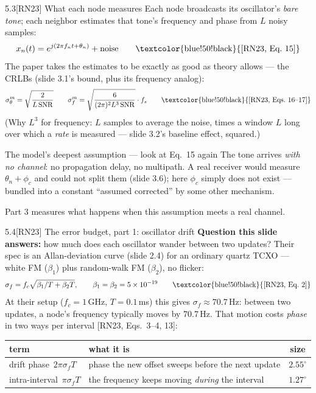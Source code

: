 \documentclass[10pt]{beamer}
\newcommand{\RN}[1]{\textcolor{blue!50!black}{[RN23#1]}}
\newcommand{\srcline}[1]{\par\vfill\noindent{\tiny\textcolor{gray}{Source: #1}}}
\begin{document}
\begin{frame}{5.3\quad \RN{} What each node measures}
\small
Each node broadcasts its oscillator's \emph{bare tone}; each neighbor
estimates that tone's frequency and phase from $L$ noisy samples:
\[
x_n(t)=e^{j(2\pi f_n t+\theta_n)}+\text{noise}
\qquad\text{\RN{, Eq.~15}}
\]
The paper takes the estimates to be exactly as good as theory allows
--- the CRLBs (slide 3.1's bound, plus its frequency analog):
\[
\sigma^m_\theta=\sqrt{\frac{2}{L\,\mathrm{SNR}}}
\qquad
\sigma^m_f=\sqrt{\frac{6}{(2\pi)^2L^3\,\mathrm{SNR}}}\cdot f_s
\qquad\text{\RN{, Eqs.~16--17}}
\]
(Why $L^3$ for frequency: $L$ samples to average the noise, times a
window $L$ long over which a \emph{rate} is measured --- slide 3.2's
baseline effect, squared.)
\begin{alertblock}{The model's deepest assumption --- look at Eq.~15 again}
The tone arrives \emph{with no channel}: no propagation delay, no
multipath. A real receiver would measure $\theta_n+\phi_c$ and could
not split them (slide 3.6); here $\phi_c$ simply does not exist ---
bundled into a constant ``assumed corrected'' by some other mechanism.
\end{alertblock}
\vspace{-2pt}
Part 3 measures what happens when this assumption meets a real channel.
\srcline{[RN23] \S II-B.}
\end{frame}

\begin{frame}{5.4\quad \RN{} The error budget, part 1: oscillator drift}
\textbf{Question this slide answers:} how much does each oscillator
wander between two updates?
\vspace{1ex}
Their spec is an Allan-deviation curve (slide 2.4) for an ordinary
quartz TCXO --- white FM ($\beta_1$) plus random-walk FM ($\beta_2$),
no flicker:
\[
\sigma_f=f_c\sqrt{\beta_1/T+\beta_2T},\qquad
\beta_1=\beta_2=5\times10^{-19}
\qquad\text{\RN{, Eq.~2}}
\]
At their setup ($f_c=1$\,GHz, $T=0.1$\,ms) this gives
$\sigma_f\approx70.7$\,Hz: between two updates, a node's frequency
typically moves by 70.7\,Hz. That motion costs \emph{phase} in two
ways per interval \RN{, Eqs.~3--4, 13}:
\begin{center}
\small
\begin{tabular}{llc}
\toprule
term & what it is & size\\
\midrule
drift phase\ $2\pi\sigma_fT$ & phase the new offset sweeps before the next update & $2.55^\circ$\\
intra-interval\ $\pi\sigma_fT$ & the frequency keeps moving \emph{during} the interval & $1.27^\circ$\\
\bottomrule
\end{tabular}
\end{center}
\srcline{[RN23] \S II-B; numerical evaluation: this deck.}
\end{frame}
\end{document}
